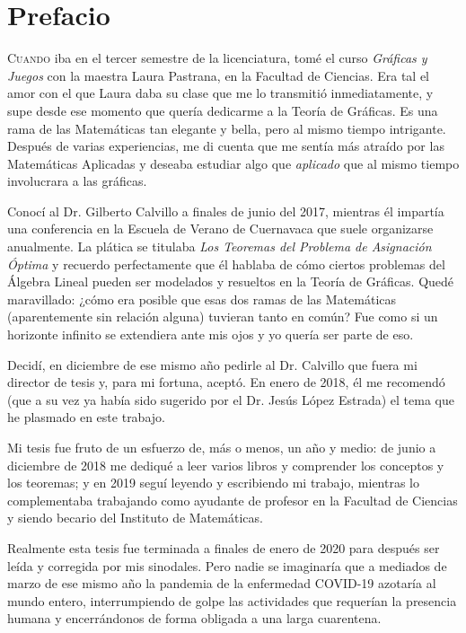 \chapter*{Prefacio}

\lettrine[lines=9] {\initfamily  \selectfont C}{uando} iba en el tercer semestre de la licenciatura, tomé el curso \textit{Gráficas y Juegos} con la maestra Laura Pastrana, en la Facultad de Ciencias. Era tal el amor con el que Laura daba su clase que me lo transmitió inmediatamente, y supe desde ese momento que quería dedicarme a la Teoría de Gráficas. Es una rama de las Matemáticas tan elegante y bella, pero al mismo tiempo intrigante. Después de varias experiencias, me di cuenta que me sentía más atraído por las Matemáticas Aplicadas y deseaba estudiar algo que \textit{aplicado} que al mismo tiempo involucrara a las gráficas. 


Conocí al Dr. Gilberto Calvillo a finales de junio del 2017, mientras él impartía una conferencia en la Escuela de Verano de Cuernavaca que suele organizarse anualmente. La plática se titulaba \textit{Los Teoremas del Problema de Asignación Óptima} y recuerdo perfectamente que él hablaba de cómo ciertos problemas del Álgebra Lineal pueden ser modelados y resueltos en la Teoría de Gráficas. Quedé maravillado: ¿cómo era posible que esas dos ramas de las Matemáticas (aparentemente sin relación alguna) tuvieran tanto en común? Fue como si un horizonte infinito se extendiera ante mis ojos y yo quería ser parte de eso.


Decidí, en diciembre de ese mismo año pedirle al Dr. Calvillo que fuera mi director de tesis y, para mi fortuna, aceptó. En enero de 2018, él me recomendó (que a su vez ya había sido sugerido por el Dr. Jesús López Estrada) el tema que he plasmado en este trabajo.


Mi tesis fue fruto de un esfuerzo de, más o menos, un año y medio: de junio a diciembre de 2018 me dediqué a leer varios libros y comprender los conceptos y los teoremas; y en 2019 seguí leyendo y escribiendo mi trabajo, mientras lo complementaba trabajando como ayudante de profesor en la Facultad de Ciencias y siendo becario del Instituto de Matemáticas.


Realmente esta tesis fue terminada a finales de enero de 2020 para después ser leída y corregida por mis sinodales. Pero nadie se imaginaría que a mediados de marzo de ese mismo año la pandemia de la enfermedad COVID-19 azotaría al mundo entero, interrumpiendo de golpe las actividades que requerían la presencia humana y encerrándonos de forma obligada a una larga cuarentena. 


